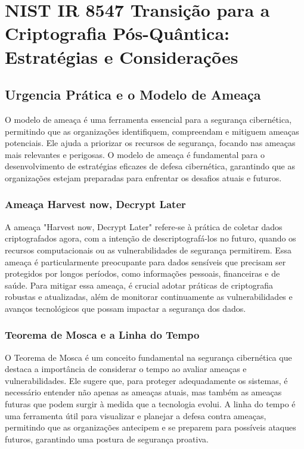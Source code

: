 \chapter{NIST IR 8547  Transição para a Criptografia Pós-Quântica: Estratégias e Considerações}
    \section{Urgencia Prática e o Modelo de Ameaça}
        O modelo de ameaça é uma ferramenta essencial para a segurança cibernética, permitindo que as organizações identifiquem, compreendam e mitiguem ameaças potenciais.
        Ele ajuda a priorizar os recursos de segurança, focando nas ameaças mais relevantes e perigosas.
        O modelo de ameaça é fundamental para o desenvolvimento de estratégias eficazes de defesa cibernética, garantindo que as organizações estejam preparadas para enfrentar os desafios atuais e futuros.
        \subsection{Ameaça Harvest now, Decrypt Later} %
            A ameaça "Harvest now, Decrypt Later" refere-se à prática de coletar dados criptografados agora, com a intenção de descriptografá-los no futuro, quando os recursos computacionais ou as vulnerabilidades de segurança permitirem.
            Essa ameaça é particularmente preocupante para dados sensíveis que precisam ser protegidos por longos períodos, como informações pessoais, financeiras e de saúde.
            Para mitigar essa ameaça, é crucial adotar práticas de criptografia robustas e atualizadas, além de monitorar continuamente as vulnerabilidades e avanços tecnológicos que possam impactar a segurança dos dados.
        \subsection{Teorema de Mosca e a Linha do Tempo} %
            O Teorema de Mosca é um conceito fundamental na segurança cibernética que destaca a importância de considerar o tempo ao avaliar ameaças e vulnerabilidades.
            Ele sugere que, para proteger adequadamente os sistemas, é necessário entender não apenas as ameaças atuais, mas também as ameaças futuras que podem surgir à medida que a tecnologia evolui.
            A linha do tempo é uma ferramenta útil para visualizar e planejar a defesa contra ameaças, permitindo que as organizações antecipem e se preparem para possíveis ataques futuros, garantindo uma postura de segurança proativa.
